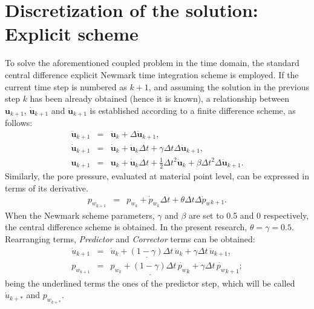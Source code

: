 \documentclass[twocolumn]{svjour3}          %
\begin{document}
\section{Discretization of the solution: Explicit scheme}
\label{sec:4}
To solve the aforementioned coupled problem in the time domain, the standard central difference explicit Newmark time integration scheme is employed. If the current time step is numbered as $k+1$, and assuming the solution in the previous step $k$ has been already obtained (hence it is known), a relationship between $\textbf{u}_{k+1}$, $\dot{\textbf{u}}_{k+1}$ and $\ddot{\textbf{u}}_{k+1}$ is established according to a finite difference scheme, as follows: 
\begin{eqnarray}
\ddot{\boldsymbol{u}}_{k+1} &=&\ddot{\boldsymbol{u}}_{k}+\Delta \ddot{\boldsymbol{u}}_{k+1},  \nonumber \\
\dot{\boldsymbol{u}}_{k+1} &=&\dot{\boldsymbol{u}}_k+\ddot{\boldsymbol{u}}_{k}\Delta t+\gamma \Delta t \Delta \ddot{\boldsymbol{u}}_{k+1}, \nonumber \\
\boldsymbol{u}_{k+1}&=&\boldsymbol{u}_{k}+\dot{\boldsymbol{u}}_{k} \Delta t+\frac{1}{2} \Delta t^{2} \ddot{\boldsymbol{u}}_{k}+\beta\Delta t^{2}\Delta \ddot{\boldsymbol{u}}_{k+1}. \label{eq_Nw}
\end{eqnarray}
Similarly, the pore pressure, evaluated at material point level, can be expressed in terms of its derivative.
\begin{eqnarray}
p_{w_{k+1}} &=&p_{w_k}+\dot{p}_{w_k}\Delta t+\theta \Delta t \Delta \dot{p}_w{_{k+1}}.  \label{eq_Nw_p}
\end{eqnarray}
When the Newmark scheme parameters, $\gamma$ and $\beta$ are set to 0.5 and 0 respectively, the central difference scheme is obtained. In the present research, $\theta=\gamma=0.5$. Rearranging terms, \textit{Predictor} and \textit{Corrector} terms can be obtained:
\begin{eqnarray}
\dot{u}_{k+1}&=&\underline{\dot{u}_{k}+(1-\gamma)\Delta t \,  \ddot{u}_{k}} + \gamma \Delta t \,  \ddot{u}_{k+1} \label{pc_1}, \\
p_{w_{k+1}}&=&\underline{p_{w_{k}}+(1-\gamma)\Delta t \,  \dot{p_w}_{k}} + \gamma \Delta t \,  \dot{p_w}_{k+1} \label{pc_2};
\end{eqnarray}
being the underlined terms the ones of the predictor step, which will be called $\dot{u}_{k+*}$ and $p_{w_{k+*}}$.
\end{document}
